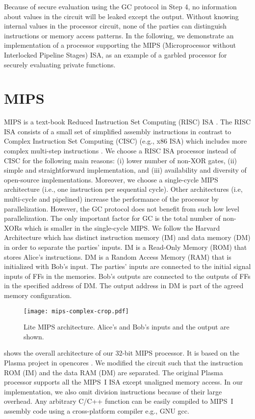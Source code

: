 Because of secure evaluation using the GC protocol in Step 4, no information about values in the circuit will be leaked except the output.
Without knowing internal values in the processor circuit, none of the parties can distinguish instructions or memory access patterns.
In the following, we demonstrate an implementation of a processor supporting the MIPS (Microprocessor without Interlocked Pipeline Stages) ISA, as an example of a garbled processor for securely evaluating private functions.

\section{MIPS}\label{sec:mips}
MIPS is a text-book Reduced Instruction Set Computing (RISC) ISA \cite{kane1992mips}.
The RISC ISA consists of a small set of simplified assembly instructions in contrast to Complex Instruction Set Computing (CISC) (e.g., x86 ISA) which includes more complex multi-step instructions \cite{hennessy2012computer}.
We choose a RISC ISA processor instead of CISC for the following main reasons: (i) lower number of non-XOR gates, (ii) simple and straightforward implementation, and (iii) availability and diversity of open-source implementations.
Moreover, we choose a single-cycle MIPS architecture (i.e., one instruction per sequential cycle).
Other architectures (i.e, multi-cycle and pipelined) increase the performance of the processor by parallelization.
However, the GC protocol does not benefit from such low level parallelization.
The only important factor for GC is the total number of non-XORs which is smaller in the single-cycle MIPS.
We follow the Harvard Architecture which has distinct instruction memory (IM) and data memory (DM) in order to separate the parties' inputs.
IM is a Read-Only Memory (ROM) that stores Alice's instructions.
DM is a Random Access Memory (RAM) that is initialized with Bob's input.
The parties' inputs are connected to the initial signal inputs of FFs in the memories.
Bob's outputs are connected to the outputs of FFs in the specified address of DM.
The output address in DM is part of the agreed memory configuration.

\begin{figure*}[t!]
\centering
\texttt{[image: mips-complex-crop.pdf]}
\caption{Lite MIPS architecture.
  Alice's and Bob's inputs and the output are shown.}\label{figure:mips}
\end{figure*}

 shows the overall architecture of our 32-bit MIPS processor.
It is based on the Plasma project in opencores \cite{rhoads2006plasma}.
We modified the circuit such that the instruction ROM (IM) and the data RAM (DM) are separated.
The original Plasma processor supports all the MIPS~I ISA except unaligned memory access.
In our implementation, we also omit division instructions because of their large overhead.
Any arbitrary C/C++ function can be easily compiled to MIPS~I assembly code using a cross-platform compiler e.g., GNU gcc.

